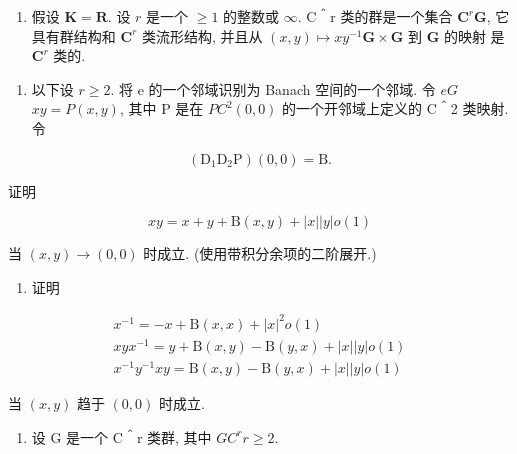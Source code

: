
\begin{enumerate}
\def\labelenumi{\arabic{enumi}.}
\tightlist
\item
  假设 \(\mathbf{K} = \mathbf{R}\). 设 \(r\) 是一个 \(\geqslant 1\) 的整数或 \(\infty\). C＾r 类的群是一个集合 \(\mathbf{C}^r\)\(\mathbf{G}\), 它具有群结构和 \(\mathbf{C}^r\) 类流形结构, 并且从 \((x,y)\mapsto xy^{-1}\)\(\mathbf{G}\times \mathbf{G}\) 到 \(\mathbf{G}\) 的映射  是 \(\mathbf{C}^r\) 类的.
\end{enumerate}

\begin{enumerate}
\def\labelenumi{(\alph{enumi})}
\tightlist
\item
  以下设 \(r \geqslant 2\). 将 e 的一个邻域识别为 Banach 空间的一个邻域. 令 \(e\)\(G\)\(xy = P(x, y)\), 其中 P 是在 \(P\)\(C^2\)\((0, 0)\) 的一个开邻域上定义的 C＾2 类映射. 令
\end{enumerate}

\[
\left(\mathrm{D} _ {1} \mathrm{D} _ {2} \mathrm{P}\right) (0, 0) = \mathrm{B}.
\]

证明

\[
x y = x + y + \mathrm{B} (x, y) + | x | | y | o (1)
\]

当 \((x,y)\to (0,0)\) 时成立. (使用带积分余项的二阶展开.)

\begin{enumerate}
\def\labelenumi{(\alph{enumi})}
\setcounter{enumi}{1}
\tightlist
\item
证明
\end{enumerate}

\[
\begin{array}{c} x ^ {- 1} = - x + \mathrm{B} (x, x) + | x | ^ {2} o (1) \\ x y x ^ {- 1} = y + \mathrm{B} (x, y) - \mathrm{B} (y, x) + | x | | y | o (1) \\ x ^ {- 1} y ^ {- 1} x y = \mathrm{B} (x, y) - \mathrm{B} (y, x) + | x | | y | o (1) \end{array}
\]

当 \((x,y)\) 趋于 \((0,0)\) 时成立.

\begin{enumerate}
\def\labelenumi{\arabic{enumi}.}
\setcounter{enumi}{1}
\tightlist
\item
  设 G 是一个 C＾r 类群, 其中 \(G\)\(C^r\)\(r \geqslant 2\).
\end{enumerate}


